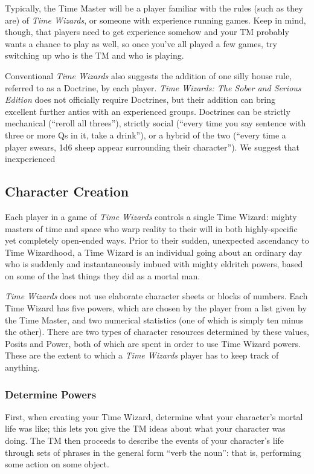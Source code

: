 \documentclass[twoside]{article}
\newcommand{\twsse}{\emph{Time Wizards: The Sober and Serious Edition}}
\newcommand{\tw}{\emph{Time Wizards}}
\begin{document}
Typically, the Time Master will be a player familiar with the rules (such as they are) of \tw{},
or someone with experience running games. Keep in mind, though, that players need to get
experience somehow and your TM probably wants a chance to play as well, so once you've all played
a few games, try switching up who is the TM and who is playing.

Conventional \tw{} also suggests the addition of one silly house rule, referred to as a Doctrine,
by each player. \twsse{} does not officially require Doctrines, but their addition can bring
excellent further antics with an experienced groups. Doctrines can be strictly mechanical
(``reroll all threes''), strictly social (``every time you say sentence with three or more Qs
in it, take a drink''), or a hybrid of the two (``every time a player swears, 1d6 sheep appear
surrounding their character''). We suggest that inexperienced

\subsection{Character Creation} \label{ssec:creation}
Each player in a game of \tw{} controls a single Time Wizard: mighty masters of time and space
who warp reality to their will in both highly-specific yet completely open-ended ways. Prior to
their sudden, unexpected ascendancy to Time Wizardhood, a Time Wizard is an individual going
about an ordinary day who is suddenly and instantaneously imbued with mighty eldritch powers,
based on some of the last things they did as a mortal man.

\tw{} does not use elaborate character sheets or blocks of numbers. Each Time Wizard has five
powers, which are chosen by the player from a list given by the Time Master, and two numerical
statistics (one of which is simply ten minus the other). There are two types of character
resources determined by these values, Posits and Power, both of which are spent in order to use
Time Wizard powers. These are the extent to which a \tw{} player has to keep track of anything.

\subsubsection{Determine Powers} \label{ssec:get-powers}
First, when creating your Time Wizard, determine what your character's mortal life was like;
this lets you give the TM ideas about what your character was doing. The TM then proceeds to
describe the events of your character's life through sets of phrases in the general form
``verb the noun'': that is, performing some action on some object.
\end{document}
